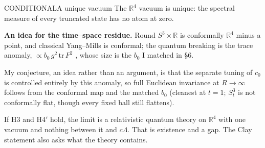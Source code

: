 \begin{claim}{CONDITIONAL}{A unique vacuum}\label{b:vacuum}
The $\mathbb R^4$ vacuum is unique: the spectral measure of every truncated state has no atom at zero.
\end{claim}

\textbf{An idea for the time--space residue.} Round $S^3\times\mathbb R$ is conformally $\mathbb R^4$ minus a point,
and classical Yang--Mills is conformal; the quantum breaking is the trace anomaly, $\propto b_0\,g^2\,\mathrm{tr}\,F^2$
\cite{CDJ77}, whose size is the $b_0$ I matched in \S6.

My conjecture, an idea rather than an argument, is that the separate tuning of $c_0$ is controlled entirely by this
anomaly, so full Euclidean invariance at $R\to\infty$ follows from the conformal map and the matched $b_0$ (cleanest at
$t=1$; $S^3_t$ is not conformally flat, though every fixed ball still flattens).

If H3 and H4$'$ hold, the limit is a relativistic quantum theory on $\mathbb R^4$ with one vacuum and nothing between it
and $c\Lambda$. That is existence and a gap. The Clay statement also asks what the theory contains.
